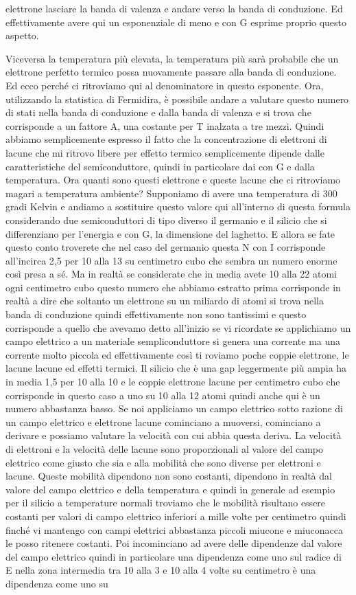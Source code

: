 {elettrone lasciare la banda di valenza e andare verso la banda di conduzione. Ed effettivamente avere qui un esponenziale di meno e con G esprime proprio questo aspetto.

Viceversa la temperatura più elevata, la temperatura più sarà probabile che un elettrone perfetto termico possa nuovamente passare alla banda di conduzione. Ed ecco perché ci ritroviamo qui al denominatore in questo esponente. Ora, utilizzando la statistica di Fermidira, è possibile andare a valutare questo numero di stati nella banda di conduzione e dalla banda di valenza e si trova che corrisponde a un fattore A, una costante per T inalzata a tre mezzi. Quindi abbiamo semplicemente espresso il fatto che la concentrazione di elettroni di lacune che mi ritrovo libere per effetto termico semplicemente dipende dalle caratteristiche del semiconduttore, quindi in particolare dai con G e dalla temperatura. Ora quanti sono questi elettrone e queste lacune che ci ritroviamo magari a temperatura ambiente? Supponiamo di avere una temperatura di 300 gradi Kelvin e andiamo a sostituire questo valore qui all'interno di questa formula considerando due semiconduttori di tipo diverso il germanio e il silicio che si differenziano per l'energia e con G, la dimensione del laghetto. E allora se fate questo conto troverete che nel caso del germanio questa N con I corrisponde all'incirca 2,5 per 10 alla 13 su centimetro cubo che sembra un numero enorme così presa a sé. Ma in realtà se considerate che in media avete 10 alla 22 atomi ogni centimetro cubo questo numero che abbiamo estratto prima corrisponde in realtà a dire che soltanto un elettrone su un miliardo di atomi si trova nella banda di conduzione quindi effettivamente non sono tantissimi e questo corrisponde a quello che avevamo detto all'inizio se vi ricordate se applichiamo un campo elettrico a un materiale sempliconduttore si genera una corrente ma una corrente molto piccola ed effettivamente così ti roviamo poche coppie elettrone, le lacune lacune ed effetti termici. Il silicio che è una gap leggermente più ampia ha in media 1,5 per 10 alla 10 e le coppie elettrone lacune per centimetro cubo che corrisponde in questo caso a uno su 10 alla 12 atomi quindi anche qui è un numero abbastanza basso. Se noi appliciamo un campo elettrico sotto razione di un campo elettrico e elettrone lacune cominciano a muoversi, cominciano a derivare e possiamo valutare la velocità con cui abbia questa deriva. La velocità di elettroni e la velocità delle lacune sono proporzionali al valore del campo elettrico come giusto che sia e alla mobilità che sono diverse per elettroni e lacune. Queste mobilità dipendono non sono costanti, dipendono in realtà dal valore del campo elettrico e della temperatura e quindi in generale ad esempio per il silicio a temperature normali troviamo che le mobilità risultano essere costanti per valori di campo elettrico inferiori a mille volte per centimetro quindi finché vi mantengo con campi elettrici abbastanza piccoli miucone e miuconacca le posso ritenere costanti. Poi incominciano ad avere delle dipendenze dal valore del campo elettrico quindi in particolare una dipendenza come uno sul radice di E nella zona intermedia tra 10 alla 3 e 10 alla 4 volte su centimetro è una dipendenza come uno su }
